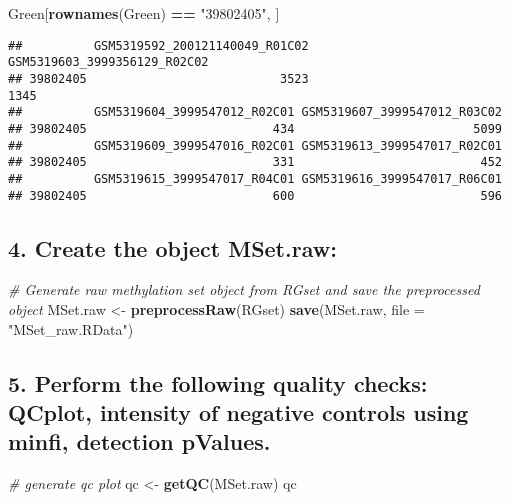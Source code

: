 \documentclass[
]{article}
\newenvironment{Shaded}{\begin{snugshade}}{\end{snugshade}}
\newcommand{\AttributeTok}[1]{\textcolor[rgb]{0.13,0.29,0.53}{#1}}
\newcommand{\CommentTok}[1]{\textcolor[rgb]{0.56,0.35,0.01}{\textit{#1}}}
\newcommand{\FunctionTok}[1]{\textcolor[rgb]{0.13,0.29,0.53}{\textbf{#1}}}
\newcommand{\NormalTok}[1]{#1}
\newcommand{\OtherTok}[1]{\textcolor[rgb]{0.56,0.35,0.01}{#1}}
\newcommand{\SpecialCharTok}[1]{\textcolor[rgb]{0.81,0.36,0.00}{\textbf{#1}}}
\newcommand{\StringTok}[1]{\textcolor[rgb]{0.31,0.60,0.02}{#1}}
\begin{document}
\begin{Shaded}
\begin{Highlighting}[]
\NormalTok{Green[}\FunctionTok{rownames}\NormalTok{(Green) }\SpecialCharTok{==} \StringTok{"39802405"}\NormalTok{, ]}
\end{Highlighting}
\end{Shaded}

\begin{verbatim}
##          GSM5319592_200121140049_R01C02 GSM5319603_3999356129_R02C02
## 39802405                           3523                         1345
##          GSM5319604_3999547012_R02C01 GSM5319607_3999547012_R03C02
## 39802405                          434                         5099
##          GSM5319609_3999547016_R02C01 GSM5319613_3999547017_R02C01
## 39802405                          331                          452
##          GSM5319615_3999547017_R04C01 GSM5319616_3999547017_R06C01
## 39802405                          600                          596
\end{verbatim}

\subsection{4. Create the object
MSet.raw:}\label{create-the-object-mset.raw}

\begin{Shaded}
\begin{Highlighting}[]
\CommentTok{\# Generate raw methylation set object from RGset and save the preprocessed object}
\NormalTok{MSet.raw }\OtherTok{\textless{}{-}} \FunctionTok{preprocessRaw}\NormalTok{(RGset)}
\FunctionTok{save}\NormalTok{(MSet.raw, }\AttributeTok{file =} \StringTok{"MSet\_raw.RData"}\NormalTok{)}
\end{Highlighting}
\end{Shaded}

\subsection{5. Perform the following quality checks: QCplot, intensity
of negative controls using minfi, detection
pValues.}\label{perform-the-following-quality-checks-qcplot-intensity-of-negative-controls-using-minfi-detection-pvalues.}

\begin{Shaded}
\begin{Highlighting}[]
\CommentTok{\# generate qc plot}
\NormalTok{qc }\OtherTok{\textless{}{-}} \FunctionTok{getQC}\NormalTok{(MSet.raw)}
\NormalTok{qc}
\end{Highlighting}
\end{Shaded}
\end{document}
